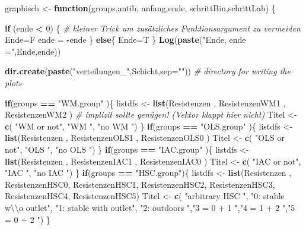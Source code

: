 \documentclass[
]{article}
\newenvironment{Shaded}{\begin{snugshade}}{\end{snugshade}}
\newcommand{\CharTok}[1]{\textcolor[rgb]{0.31,0.60,0.02}{#1}}
\newcommand{\CommentTok}[1]{\textcolor[rgb]{0.56,0.35,0.01}{\textit{#1}}}
\newcommand{\ControlFlowTok}[1]{\textcolor[rgb]{0.13,0.29,0.53}{\textbf{#1}}}
\newcommand{\DataTypeTok}[1]{\textcolor[rgb]{0.13,0.29,0.53}{#1}}
\newcommand{\DecValTok}[1]{\textcolor[rgb]{0.00,0.00,0.81}{#1}}
\newcommand{\KeywordTok}[1]{\textcolor[rgb]{0.13,0.29,0.53}{\textbf{#1}}}
\newcommand{\NormalTok}[1]{#1}
\newcommand{\OperatorTok}[1]{\textcolor[rgb]{0.81,0.36,0.00}{\textbf{#1}}}
\newcommand{\StringTok}[1]{\textcolor[rgb]{0.31,0.60,0.02}{#1}}
\begin{document}
\begin{Shaded}
\begin{Highlighting}[]
\NormalTok{graphisch <-}\StringTok{ }\ControlFlowTok{function}\NormalTok{(groups,antib, anfang,ende, schrittBin,schrittLab) \{    }

  \ControlFlowTok{if}\NormalTok{ (ende }\OperatorTok{<}\StringTok{ }\DecValTok{0}\NormalTok{) \{            }\CommentTok{# kleiner Trick um zusätzliches Funktionsargument zu vermeiden}
\NormalTok{    Ende=F}
\NormalTok{    ende =}\StringTok{ }\OperatorTok{-}\NormalTok{ende}
\NormalTok{  \} }\ControlFlowTok{else}\NormalTok{\{}
\NormalTok{    Ende=T}
\NormalTok{  \}}
  \KeywordTok{Log}\NormalTok{(}\KeywordTok{paste}\NormalTok{(}\StringTok{"Ende, ende ="}\NormalTok{,Ende,ende))}
  
  \KeywordTok{dir.create}\NormalTok{(}\KeywordTok{paste}\NormalTok{(}\StringTok{"verteilungen_"}\NormalTok{,Schicht,}\DataTypeTok{sep=}\StringTok{""}\NormalTok{))             }\CommentTok{# directory for writing the plots}
  
  \ControlFlowTok{if}\NormalTok{(groups }\OperatorTok{==}\StringTok{ "WM.group"}\NormalTok{ )\{}
\NormalTok{    listdfs <-}\StringTok{ }\KeywordTok{list}\NormalTok{(Resistenzen    , ResistenzenWM1 , ResistenzenWM2 )  }\CommentTok{#  implizit sollte genügen! (Vektor klappt hier nicht)}
\NormalTok{    Titel   <-}\StringTok{ }\KeywordTok{c}\NormalTok{(   }\StringTok{"WM or not"}\NormalTok{, }\StringTok{"WM           "}\NormalTok{, }\StringTok{"no WM     "}\NormalTok{)}
\NormalTok{  \}}
   \ControlFlowTok{if}\NormalTok{(groups }\OperatorTok{==}\StringTok{ "OLS.group"}\NormalTok{ )\{}
\NormalTok{    listdfs <-}\StringTok{ }\KeywordTok{list}\NormalTok{(Resistenzen    , ResistenzenOLS1 , ResistenzenOLS0 )  }
\NormalTok{    Titel   <-}\StringTok{ }\KeywordTok{c}\NormalTok{(   }\StringTok{"OLS or not"}\NormalTok{, }\StringTok{"OLS           "}\NormalTok{, }\StringTok{"no OLS      "}\NormalTok{)}
\NormalTok{  \}}
   \ControlFlowTok{if}\NormalTok{(groups }\OperatorTok{==}\StringTok{ "IAC.group"}\NormalTok{ )\{}
\NormalTok{    listdfs <-}\StringTok{ }\KeywordTok{list}\NormalTok{(Resistenzen    , ResistenzenIAC1 , ResistenzenIAC0 ) }
\NormalTok{    Titel   <-}\StringTok{ }\KeywordTok{c}\NormalTok{(   }\StringTok{"IAC or not"}\NormalTok{, }\StringTok{"IAC           "}\NormalTok{, }\StringTok{"no IAC      "}\NormalTok{)}
\NormalTok{  \}}
  \ControlFlowTok{if}\NormalTok{(groups }\OperatorTok{==}\StringTok{ "HSC.group"}\NormalTok{)\{}
\NormalTok{    listdfs <-}\StringTok{ }\KeywordTok{list}\NormalTok{(Resistenzen    , ResistenzenHSC0, ResistenzenHSC1, }
\NormalTok{                    ResistenzenHSC2, ResistenzenHSC3, ResistenzenHSC4, ResistenzenHSC5)  }
\NormalTok{    Titel   <-}\StringTok{ }\KeywordTok{c}\NormalTok{(   }\StringTok{"arbitrary HSC          "}\NormalTok{, }
                    \StringTok{"0: stable w}\CharTok{\textbackslash{}\textbackslash{}}\StringTok{o  outlet"}\NormalTok{, }\StringTok{"1: stable with outlet"}\NormalTok{, }\StringTok{"2: outdoors          "}\NormalTok{,}\StringTok{"3 = 0 + 1      "}\NormalTok{,}\StringTok{"4 = 1 + 2      "}\NormalTok{,}\StringTok{"5 = 0 + 2       "}\NormalTok{)}
\NormalTok{  \}}
  

\end{Highlighting}
\end{Shaded}
\end{document}
